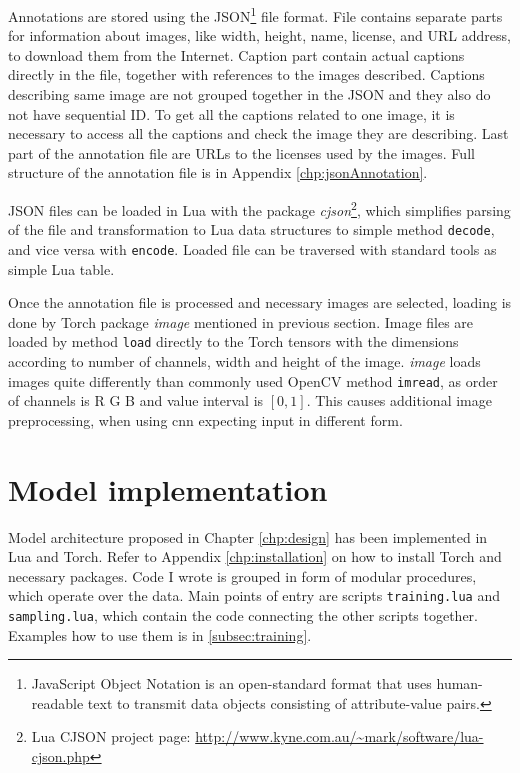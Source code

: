 Annotations are stored using the JSON\footnote{JavaScript Object Notation is an open-standard format that uses human-readable text to transmit data objects consisting of attribute-value pairs.} file format. File contains separate parts for information about images, like width, height, name, license, and URL address, to download them from the Internet. Caption part contain actual captions directly in the file, together with references to the images described. Captions describing same image are not grouped together in the JSON and they also do not have sequential ID. To get all the captions related to one image, it is necessary to access all the captions and check the image they are describing. Last part of the annotation file are URLs to the licenses used by the images. Full structure of the annotation file is in Appendix \ref{chp:jsonAnnotation}.
 
JSON files can be loaded in Lua with the package \emph{cjson}\footnote{Lua CJSON project page: \url{http://www.kyne.com.au/~mark/software/lua-cjson.php}}, which simplifies parsing of the file and transformation to Lua data structures to simple method \texttt{decode}, and vice versa with \texttt{encode}. Loaded file can be traversed with standard tools as simple Lua table.

Once the annotation file is processed and necessary images are selected, loading is done by Torch package \emph{image} mentioned in previous section. Image files are loaded by method \texttt{load} directly to the Torch tensors with the dimensions according to number of channels, width and height of the image. \emph{image} loads images quite differently than commonly used OpenCV method \texttt{imread}, as order of channels is R G B and value interval is $ [0 , 1] $. This causes additional image preprocessing, when using \gls{cnn} expecting input in different form.

\section{Model implementation} \label{sec:designimplem}

Model architecture proposed in Chapter \ref{chp:design} has been implemented in Lua and Torch. Refer to Appendix \ref{chp:installation} on how to install Torch and necessary packages. Code I wrote is grouped in form of modular procedures, which operate over the data. Main points of entry are scripts \texttt{training.lua} and \texttt{sampling.lua}, which contain the code connecting the other scripts together. Examples how to use them is in \ref{subsec:training}.

